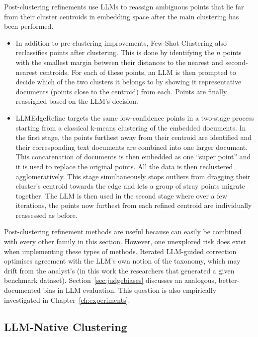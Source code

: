 \documentclass[11pt,a4paper,oneside]{report}
\begin{document}
Post-clustering refinements use LLMs to reassign ambiguous points that lie far from their cluster centroids in embedding space after the main clustering has been performed.
\begin{itemize}
\item In addition to pre-clustering improvements, Few-Shot Clustering \citep{viswanathan2024fewshot} also reclassifies points after clustering. This is done by identifying the $n$ points with the smallest margin between their distances to the nearest and second-nearest centroids. For each of these points, an LLM is then prompted to decide which of the two clusters it belongs to by showing it representative documents (points close to the centroid) from each. Points are finally reassigned based on the LLM's decision.
\item LLMEdgeRefine \citep{feng2024llmedgerefine} targets the same low-confidence points in a two-stage process starting from a classical k-means clustering of the embedded documents. In the first stage, the points furthest away from their centroid are identified and their corresponding text documents are combined into one larger document. This concatenation of documents is then embedded as one ``super point'' and it is used to replace the original points. All the data is then reclustered agglomeratively. This stage simultaneously stops outliers from dragging their cluster's centroid towards the edge and lets a group of stray points migrate together. The LLM is then used in the second stage where over a few iterations, the points now furthest from each refined centroid are individually reassessed as before.
\end{itemize}
Post-clustering refinement methods are useful because can easily be combined with every other family in this section. However, one unexplored risk does exist when implementing these types of methods. Iterated LLM-guided correction optimises agreement with the LLM's own notion of the taxonomy, which may drift from the analyst's (in this work the researchers that generated a given benchmark dataset). Section~\ref{sec:judgebiases} discusses an analogous, better-documented bias in LLM evaluation. This question is also empirically investigated in Chapter~\ref{ch:experiments}.

\subsection{LLM-Native Clustering}\label{sec:llmnative}
\end{document}
